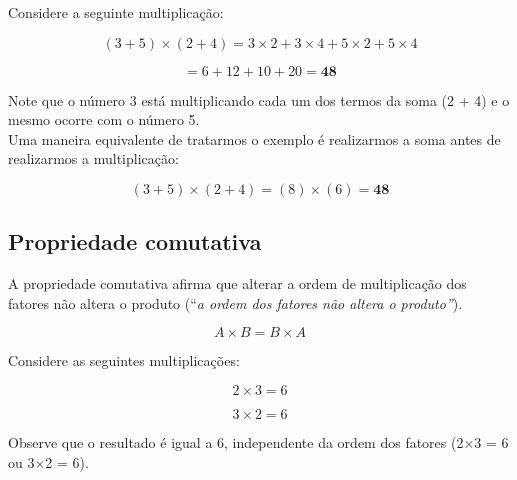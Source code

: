 \begin{enumerate}
    \begin{exemplo}
        Considere a seguinte multiplicação:

        \begin{equation}
            (3 + 5)\times(2 + 4) = 3\times2 + 3\times4 + 5\times2 + 5\times4 
        \end{equation}

        \begin{equation}
            = 6 + 12 + 10 + 20 = \textbf{48}
        \end{equation}

        Note que o número 3 está multiplicando cada um dos termos da soma (2 + 4) e o mesmo ocorre com o número 5.\\
        
        Uma maneira equivalente de tratarmos o exemplo é realizarmos a soma antes de realizarmos a multiplicação:

        \begin{equation}
             (3 + 5)\times(2 + 4) = (8)\times(6) = \textbf{48}
        \end{equation}
    \end{exemplo}    
\end{enumerate}

\subsection{Propriedade comutativa}

A propriedade comutativa afirma que alterar a ordem de multiplicação dos fatores não altera o produto (``\textit{a ordem dos fatores não altera o produto''}).

\begin{equation}
    A\times B=B\times A
\end{equation}

\begin{exemplo}
    Considere as seguintes multiplicações:

    \begin{equation}
        2\times 3= 6
    \end{equation}

    \begin{equation}
        3\times 2= 6
    \end{equation}

    Observe que o resultado é igual a 6, independente da ordem dos fatores (2\(\times\)3 = 6 ou 3\(\times\)2 = 6).
\end{exemplo}

